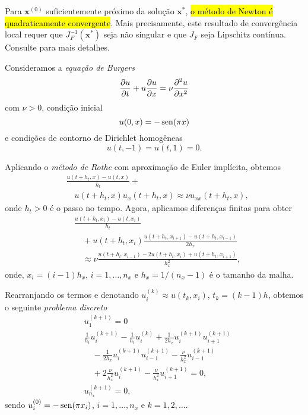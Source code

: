 \begin{obs}[\hl{Convergência}]\label{cap_otimizacao_sec_newton:obs:convNewton}
  Para $\pmb{x}^{(0)}$ suficientemente próximo da solução $\pmb{x}^*$, \hl{o método de Newton é quadraticamente convergente}. Mais precisamente, este resultado de convergência local requer que $J_F^{-1}(\pmb{x}^*)$ seja não singular e que $J_F$ seja Lipschitz{\lipschitz} contínua. Consulte \cite[Seção 7.1]{Quarteroni2007a} para mais detalhes.
\end{obs}

\begin{ex}\label{ex:burgers}
  Consideramos a \emph{equação de Burgers}{\burgers}
  \begin{equation}
    \frac{\partial u}{\partial t} + u\frac{\partial u}{\partial x} = \nu\frac{\partial^2 u}{\partial x^2}
  \end{equation}
  com $\nu>0$, condição inicial
  \begin{equation}
    u(0,x) = -\operatorname{sen}(\pi x)
  \end{equation}
  e condições de contorno de Dirichlet{\dirichlet} homogêneas
  \begin{equation}
    u(t,-1) = u(t,1) = 0.
  \end{equation}

  Aplicando o \emph{método de Rothe}{\rothe} com aproximação de Euler{\euler} implícita, obtemos
  \begin{equation}
    \begin{aligned}
      & \frac{u(t+h_t,x) - u(t,x)}{h_t} +\\
      &\quad u(t+h_t,x)u_x(t+h_t,x) \approx \nu u_{xx}(t+h_t,x),
    \end{aligned}
  \end{equation}
  onde $h_t>0$ é o passo no tempo. Agora, aplicamos diferenças finitas para obter
  \begin{equation}
    \begin{aligned}
      &\frac{u(t+h_t,x_i) - u(t,x_i)}{h_t} \\
      &\quad + u(t+h_t, x_i)\frac{u(t+h_t,x_{i+1})-u(t+h_t,x_{i-1})}{2h_x} \\
      &\quad \approx \nu\frac{u(t+h_t,x_{i-1}) - 2u(t+h_t,x_i) + u(t+h_t,x_{i+1})}{h_x^2},
    \end{aligned} 
 \end{equation}
  onde, $x_i=(i-1)h_x$, $i=1,\dotsc,n_x$ e $h_x=1/(n_x-1)$ é o tamanho da malha.

  Rearranjando os termos e denotando $u^{(k)}_i\approx u(t_k, x_i)$, $t_k = (k-1)h$, obtemos o seguinte \emph{problema discreto}
  \begin{align}
    & u^{(k+1)}_1 = 0\\
    & \frac{1}{h_t}u^{(k+1)}_i - \frac{1}{h_t}u^{(k)}_i + \frac{1}{2h_x}u^{(k+1)}_iu^{(k+1)}_{i+1} \nonumber\\
    &\quad - \frac{1}{2h_x}u^{(k+1)}_{i}u^{(k+1)}_{i-1} - \frac{\nu}{h_x^2}u^{(k+1)}_{i-1} \nonumber\\ 
    &\quad + 2\frac{\nu}{h_x^2}u^{(k+1)}_i - \frac{\nu}{h_x^2}u^{(k+1)}_{i+1} = 0,\\
    & u^{(k+1)}_{n_x} = 0,
  \end{align}
  sendo $u^{(0)}_i = -\operatorname{sen}(\pi x_i)$, $i = 1, \dotsc, n_x$ e $k = 1, 2, \ldots$.


\end{ex}
